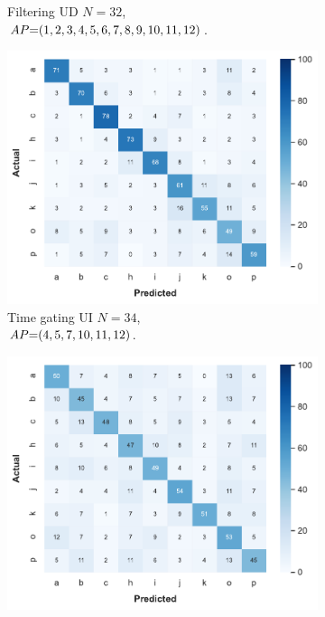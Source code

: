 \begin{figure}[ht]
\begin{subfigure}{.49\textwidth}
    \vspace{-15pt}
    \captionsetup{width=.99\linewidth}
    \caption{Filtering UD $N{=}32$, \\ $\splitatcommas{AP{=}(1, 2, 3, 4, 5, 6, 7, 8, 9, 10, 11, 12)}$.}
    \label{fig:radar-experiments:through-materials:pvc-confusion:filtering-ud}
  \end{subfigure}
  
  \begin{subfigure}{.49\textwidth}
    \centering
    \includegraphics[width=.99\linewidth]{Figures/RadarExperiments/Datasets/ThroughMaterials/PVC/confusion-timegating-ui.pdf}  
    \vspace{-15pt}
    \captionsetup{width=.99\linewidth}
    \caption{Time gating UI $N{=}34$, \\ $\splitatcommas{AP{=}(4, 5, 7, 10, 11, 12)}$.}
    \label{fig:radar-experiments:through-materials:pvc-confusion:timegating-ui}
  \end{subfigure}
  \begin{subfigure}{.49\textwidth}
    \centering
    \includegraphics[width=.99\linewidth]{Figures/RadarExperiments/Datasets/ThroughMaterials/PVC/confusion-filtering-ui.pdf}

\end{subfigure}
\end{figure}
